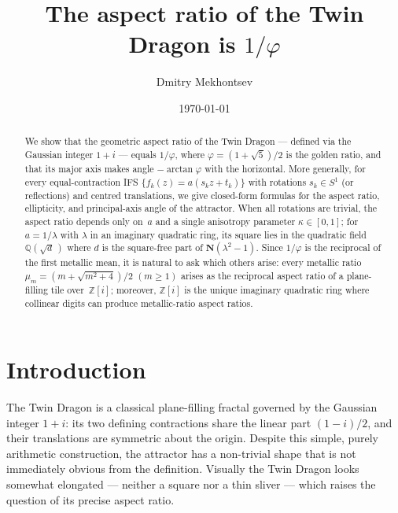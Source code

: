 \documentclass{amsart}
\title{The aspect ratio of the Twin Dragon is $1/\varphi$}
\author{Dmitry Mekhontsev}
\date{\today}
\theoremstyle{definition}
\theoremstyle{remark}
\begin{document}
\begin{abstract}
We show that the geometric aspect ratio of the Twin Dragon
--- defined via the Gaussian integer $1+i$ ---
equals $1/\varphi$, where $\varphi=(1+\sqrt{5})/2$ is the golden ratio,
and that its major axis makes angle $-\arctan\varphi$ with the horizontal.
More generally, for every equal-contraction IFS
$\{f_k(z)=a(s_k z+t_k)\}$ with rotations $s_k\in S^1$
(or reflections) and centred translations,
we give closed-form formulas for the aspect ratio, ellipticity, and
principal-axis angle of the attractor.
When all rotations are trivial, the aspect ratio depends only on~$a$
and a single anisotropy parameter $\kappa\in[0,1]$;
for $a=1/\lambda$ with $\lambda$ in an imaginary quadratic ring,
its square lies in the quadratic field $\mathbb{Q}(\sqrt{d}\,)$
where $d$ is the square-free part of $\mathbf{N}(\lambda^2\!-\!1)$.
Since $1/\varphi$ is the reciprocal of the first metallic mean, it is natural to ask
which others arise: every metallic ratio
$\mu_m=(m+\sqrt{m^2+4})/2$ $(m\geq 1)$
arises as the reciprocal aspect ratio of a plane-filling tile
over~$\mathbb{Z}[i]$;
moreover, $\mathbb{Z}[i]$ is the unique imaginary quadratic ring
where collinear digits can produce metallic-ratio aspect ratios.
\end{abstract}

\maketitle

\section{Introduction}

The Twin Dragon is a classical plane-filling fractal \cite{DavisKnuth1970} governed
by the Gaussian integer $1+i$: its two defining contractions share the linear part
$(1-i)/2$, and their translations are symmetric about the origin.
Despite this simple, purely arithmetic construction, the attractor has a non-trivial
shape that is not immediately obvious from the definition.
Visually the Twin Dragon looks somewhat elongated --- neither a square nor a thin
sliver --- which raises the question of its precise aspect ratio.
\end{document}
